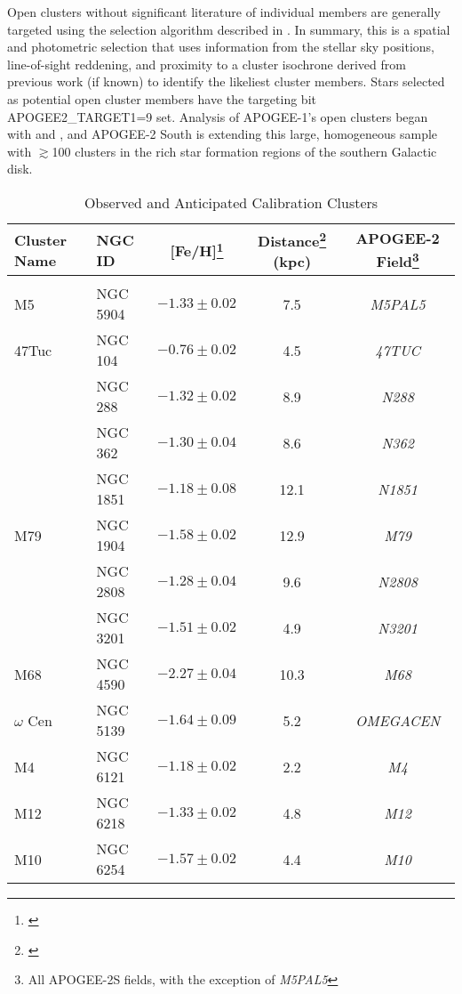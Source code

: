 \documentclass[12pt,twocolumn]{emulateapj}
\begin{document}
Open clusters without significant literature of individual members are generally targeted using the selection algorithm described in \citet{Frinchaboy_2013_apogeeOCs}.  In summary, this is a spatial and photometric selection that uses information from the stellar sky positions, line-of-sight reddening, and proximity to a cluster isochrone derived from previous work (if known) to identify the likeliest cluster members.
Stars selected as potential open cluster members have the targeting bit APOGEE2\_TARGET1=9 set.
Analysis of APOGEE-1's open clusters began with \citet{Frinchaboy_2013_apogeeOCs} and \citet{Cunha_2015_occam}, and APOGEE-2 South is extending this large, homogeneous sample with $\gtrsim$100 clusters in the rich star formation regions of the southern Galactic disk.

\begin{table*}[hpbt]
  \begin{center}
  \caption{Observed and Anticipated Calibration Clusters}
  \begin{tabular}{l l c c c}
Cluster Name & NGC ID & [Fe/H]\footnote{\cite{carretta_feh}} & Distance\footnote{\cite{Harris_1996_MWGCs,Harris_2010_newMWGCs}} (kpc) & APOGEE-2 Field\footnote{All APOGEE-2S fields, with the exception of {\it M5PAL5}} \\
  \hline
  \\
M5 & NGC 5904 & $-1.33 \pm 0.02$  & 7.5  & {\it M5PAL5} \\
47Tuc & NGC 104 & $-0.76 \pm 0.02$ & 4.5  & {\it 47TUC} \\
      & NGC 288 & $-1.32 \pm 0.02$ & 8.9  & {\it N288} \\
      & NGC 362 &  $-1.30 \pm 0.04$ & 8.6  & {\it N362} \\
      & NGC 1851 & $-1.18 \pm 0.08$ & 12.1 & {\it N1851} \\
M79   & NGC 1904 & $-1.58 \pm 0.02$ & 12.9 & {\it M79} \\
      & NGC 2808 & $-1.28 \pm 0.04$ & 9.6  & {\it N2808} \\
      & NGC 3201 & $-1.51 \pm 0.02$ & 4.9  & {\it N3201} \\
M68 & NGC 4590 & $-2.27 \pm 0.04$ & 10.3  & {\it M68} \\
$\omega$ Cen & NGC 5139 & $-1.64 \pm 0.09$& 5.2  & {\it OMEGACEN} \\
M4 & NGC 6121 & $-1.18 \pm 0.02$ & 2.2  & {\it M4} \\
M12 & NGC 6218 & $-1.33 \pm 0.02$ & 4.8 & {\it M12} \\
M10 & NGC 6254 &  $-1.57 \pm 0.02$ & 4.4 & {\it M10} \\

\end{tabular}
\end{center}
\end{table*}
\end{document}
